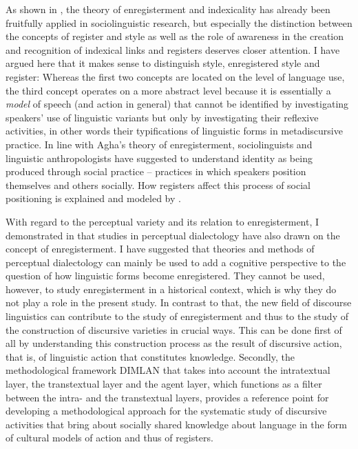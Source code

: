 As shown in , the theory of enregisterment and indexicality has already been fruitfully applied in sociolinguistic research, but especially the distinction between the concepts of register and style as well as the role of awareness in the creation and recognition of indexical links and registers deserves closer attention. I have argued here that it makes sense to distinguish style, enregistered style and register: Whereas the first two concepts are located on the level of language use, the third concept operates on a more abstract level because it is essentially a \emph{model} of speech (and action in general) that cannot be identified by investigating speakers’ use of linguistic variants but only by investigating their reflexive activities, in other words their typifications of linguistic forms in metadiscursive practice. In line with Agha’s theory of enregisterment, sociolinguists and linguistic anthropologists have suggested to understand identity as being produced through social practice – practices in which speakers position themselves and others socially. How registers affect this process of social positioning is explained and modeled by \citet{Spitzmuller2013, Spitzmuller2015, Spitzmuller10062016}.

With regard to the perceptual variety and its relation to enregisterment, I demonstrated in  that studies in perceptual dialectology have also drawn on the concept of enregisterment. I have suggested that theories and methods of perceptual dialectology can mainly be used to add a cognitive perspective to the question of how linguistic forms become enregistered. They cannot be used, however, to study enregisterment in a historical context, which is why they do not play a role in the present study. In contrast to that, the new field of discourse linguistics can contribute to the study of enregisterment and thus to the study of the construction of discursive varieties in crucial ways. This can be done first of all by understanding this construction process as the result of discursive action, that is, of linguistic action that constitutes knowledge. Secondly, the methodological framework DIMLAN that takes into account the intratextual layer, the transtextual layer and the agent layer, which functions as a filter between the intra- and the transtextual layers, provides a reference point for developing a methodological approach for the systematic study of discursive activities that bring about socially shared knowledge about language in the form of cultural models of action and thus of registers.


